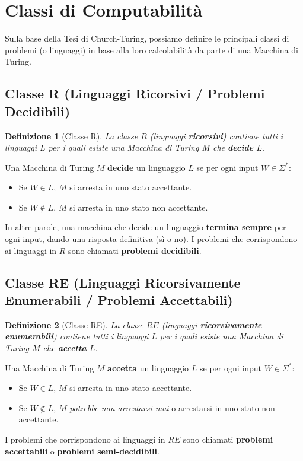 \documentclass[a4paper]{article}
\newtheorem{definition}{Definizione}
\begin{document}
\section{Classi di Computabilità}

Sulla base della Tesi di Church-Turing, possiamo definire le principali classi di problemi (o linguaggi) in base alla loro calcolabilità da parte di una Macchina di Turing.


\subsection{Classe R (Linguaggi Ricorsivi / Problemi Decidibili)}
\begin{definition}[Classe R]
La classe $R$ (linguaggi \textbf{ricorsivi}) contiene tutti i linguaggi $L$ per i quali esiste una Macchina di Turing $M$ che \textbf{decide} $L$.
\end{definition}
Una Macchina di Turing $M$ \textbf{decide} un linguaggio $L$ se per ogni input $W \in \Sigma^*$:
\begin{itemize}
    \item Se $W \in L$, $M$ si arresta in uno stato accettante.
    \item Se $W \notin L$, $M$ si arresta in uno stato non accettante.
\end{itemize}
In altre parole, una macchina che decide un linguaggio \textbf{termina sempre} per ogni input, dando una risposta definitiva (sì o no). I problemi che corrispondono ai linguaggi in $R$ sono chiamati \textbf{problemi decidibili}.

\subsection{Classe RE (Linguaggi Ricorsivamente Enumerabili / Problemi Accettabili)}
\begin{definition}[Classe RE]
La classe $RE$ (linguaggi \textbf{ricorsivamente enumerabili}) contiene tutti i linguaggi $L$ per i quali esiste una Macchina di Turing $M$ che \textbf{accetta} $L$.
\end{definition}
Una Macchina di Turing $M$ \textbf{accetta} un linguaggio $L$ se per ogni input $W \in \Sigma^*$:
\begin{itemize}
    \item Se $W \in L$, $M$ si arresta in uno stato accettante.
    \item Se $W \notin L$, $M$ \emph{potrebbe non arrestarsi mai} o arrestarsi in uno stato non accettante.
\end{itemize}
I problemi che corrispondono ai linguaggi in $RE$ sono chiamati \textbf{problemi accettabili} o \textbf{problemi semi-decidibili}.
\end{document}
